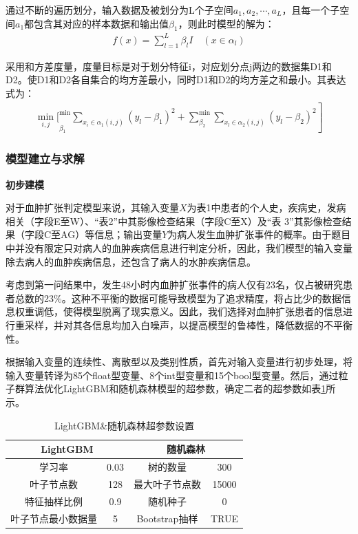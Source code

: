\documentclass[bwprint]{gmcmthesis}
\begin{document}
通过不断的遍历划分，输入数据及被划分为L个子空间$a_1, a_2, \cdots, a_L$，且每一个子空间$a_1$都包含其对应的样本数据和输出值$\beta_1$，则此时模型的解为：
\begin{equation}
\begin{aligned}
f(x)=\sum_{l=1}^L \beta_l I \quad\left(x \in \alpha_l\right)
\end{aligned}
\label{equ:11}
\end{equation}

采用和方差度量，度量目标是对于划分特征i，对应划分点j两边的数据集D1和D2。使D1和D2各自集合的均方差最小，同时D1和D2的均方差之和最小。其表达式为：
\begin{equation}
\begin{aligned}
\left.{\underset{i, j}{\min }[}_{\beta_1}^{\min } \sum_{x_i \in \alpha_1(i, j)}\left(y_l-\beta_1\right)^2+\sum_{\beta_2}^{\min } \sum_{x_l \in \alpha_2(i, j)}\left(y_l-\beta_2\right)^2\right]
\end{aligned}
\label{equ:12}
\end{equation}
\subsubsection{模型建立与求解}
{\textbf{初步建模}}\par
对于血肿扩张判定模型来说，其输入变量$X$为表1中患者的个人史，疾病史，发病相关（字段E至W）、“表2”中其影像检查结果（字段C至X）及“表 3”其影像检查结果（字段C至AG）等信息；输出变量$Y$为病人发生血肿扩张事件的概率。由于题目中并没有限定只对病人的血肿疾病信息进行判定分析，因此，我们模型的输入变量除去病人的血肿疾病信息，还包含了病人的水肿疾病信息。

考虑到第一问结果中，发生48小时内血肿扩张事件的病人仅有23名，仅占被研究患者总数的23\%。这种不平衡的数据可能导致模型为了追求精度，将占比少的数据信息权重调低，使得模型脱离了现实意义。因此，我们选择对血肿扩张患者的信息进行重采样，并对其各信息均加入白噪声，以提高模型的鲁棒性，降低数据的不平衡性。

根据输入变量的连续性、离散型以及类别性质，首先对输入变量进行初步处理，将输入变量转译为85个float型变量、8个int型变量和15个bool型变量。然后，通过粒子群算法优化LightGBM和随机森林模型的超参数，确定二者的超参数如表\ref{tab:2}所示。

\begin{table}[ht]
\centering
\caption{LightGBM\&随机森林超参数设置}
\label{tab:2}
\fontsize{11}{9}\selectfont
\renewcommand\tabcolsep{6pt}
{
\begin{tabular}{cc|cc}
\toprule[1.2pt]
\multicolumn{2}{c|}{\textbf{LightGBM}} & \multicolumn{2}{c}{\textbf{随机森林}} \\ \midrule
学习率                & 0.03          & 树的数量           & 300     \\
叶子节点数              & 128           & 最大叶子节点数        & 15000   \\
特征抽样比例             & 0.9           & 随机种子           & 0       \\
叶子节点最小数据量          & 5             & Bootstrap抽样    & TRUE    \\  \bottomrule[1.2pt]
\end{tabular}}
\end{table}
\end{document}
